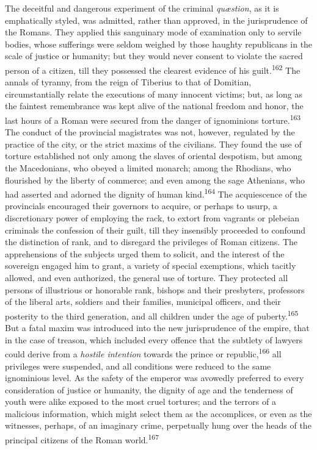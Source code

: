 The deceitful and dangerous experiment of the criminal
\textit{quæstion}, as it is emphatically styled, was admitted, rather
than approved, in the jurisprudence of the Romans. They applied
this sanguinary mode of examination only to servile bodies, whose
sufferings were seldom weighed by those haughty republicans in
the scale of justice or humanity; but they would never consent to
violate the sacred person of a citizen, till they possessed the
clearest evidence of his guilt.\textsuperscript{162} The annals of tyranny, from
the reign of Tiberius to that of Domitian, circumstantially
relate the executions of many innocent victims; but, as long as
the faintest remembrance was kept alive of the national freedom
and honor, the last hours of a Roman were secured from the danger
of ignominions torture.\textsuperscript{163} The conduct of the provincial
magistrates was not, however, regulated by the practice of the
city, or the strict maxims of the civilians. They found the use
of torture established not only among the slaves of oriental
despotism, but among the Macedonians, who obeyed a limited
monarch; among the Rhodians, who flourished by the liberty of
commerce; and even among the sage Athenians, who had asserted and
adorned the dignity of human kind.\textsuperscript{164} The acquiescence of the
provincials encouraged their governors to acquire, or perhaps to
usurp, a discretionary power of employing the rack, to extort
from vagrants or plebeian criminals the confession of their
guilt, till they insensibly proceeded to confound the distinction
of rank, and to disregard the privileges of Roman citizens. The
apprehensions of the subjects urged them to solicit, and the
interest of the sovereign engaged him to grant, a variety of
special exemptions, which tacitly allowed, and even authorized,
the general use of torture. They protected all persons of
illustrious or honorable rank, bishops and their presbyters,
professors of the liberal arts, soldiers and their families,
municipal officers, and their posterity to the third generation,
and all children under the age of puberty.\textsuperscript{165} But a fatal maxim
was introduced into the new jurisprudence of the empire, that in
the case of treason, which included every offence that the
subtlety of lawyers could derive from a \textit{hostile intention}
towards the prince or republic,\textsuperscript{166} all privileges were
suspended, and all conditions were reduced to the same
ignominious level. As the safety of the emperor was avowedly
preferred to every consideration of justice or humanity, the
dignity of age and the tenderness of youth were alike exposed to
the most cruel tortures; and the terrors of a malicious
information, which might select them as the accomplices, or even
as the witnesses, perhaps, of an imaginary crime, perpetually
hung over the heads of the principal citizens of the Roman world.\textsuperscript{167}

